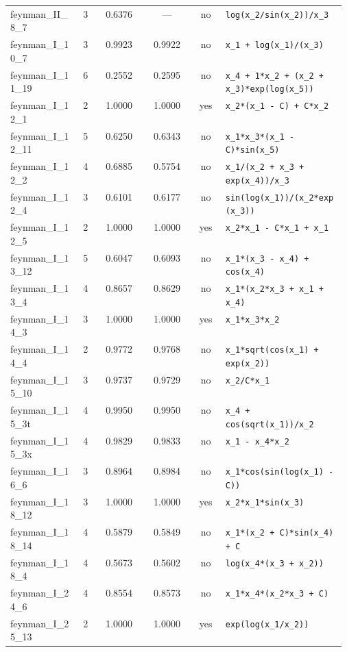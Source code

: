 \begin{footnotesize}
\begin{longtable}{p{0.215\linewidth} c c c c p{0.36\linewidth}}
feynman\_II\_8\_7 & 3 & 0.6376 & --- & no & \texttt{log(x\_2/sin(x\_2))/x\_3} \\
feynman\_I\_10\_7 & 3 & 0.9923 & 0.9922 & no & \texttt{x\_1 + log(x\_1)/(x\_3)} \\
feynman\_I\_11\_19 & 6 & 0.2552 & 0.2595 & no & \texttt{x\_4 + 1*x\_2 + (x\_2 + x\_3)*exp(log(x\_5))} \\
feynman\_I\_12\_1 & 2 & 1.0000 & 1.0000 & yes & \texttt{x\_2*(x\_1 - C) + C*x\_2} \\
feynman\_I\_12\_11 & 5 & 0.6250 & 0.6343 & no & \texttt{x\_1*x\_3*(x\_1 - C)*sin(x\_5)} \\
feynman\_I\_12\_2 & 4 & 0.6885 & 0.5754 & no & \texttt{x\_1/(x\_2 + x\_3 + exp(x\_4))/x\_3} \\
feynman\_I\_12\_4 & 3 & 0.6101 & 0.6177 & no & \texttt{sin(log(x\_1))/(x\_2*exp(x\_3))} \\
feynman\_I\_12\_5 & 2 & 1.0000 & 1.0000 & yes & \texttt{x\_2*x\_1 - C*x\_1 + x\_1} \\
feynman\_I\_13\_12 & 5 & 0.6047 & 0.6093 & no & \texttt{x\_1*(x\_3 - x\_4) + cos(x\_4)} \\
feynman\_I\_13\_4 & 4 & 0.8657 & 0.8629 & no & \texttt{x\_1*(x\_2*x\_3 + x\_1 + x\_4)} \\
feynman\_I\_14\_3 & 3 & 1.0000 & 1.0000 & yes & \texttt{x\_1*x\_3*x\_2} \\
feynman\_I\_14\_4 & 2 & 0.9772 & 0.9768 & no & \texttt{x\_1*sqrt(cos(x\_1) + exp(x\_2))} \\
feynman\_I\_15\_10 & 3 & 0.9737 & 0.9729 & no & \texttt{x\_2/C*x\_1} \\
feynman\_I\_15\_3t & 4 & 0.9950 & 0.9950 & no & \texttt{x\_4 + cos(sqrt(x\_1))/x\_2} \\
feynman\_I\_15\_3x & 4 & 0.9829 & 0.9833 & no & \texttt{x\_1 - x\_4*x\_2} \\
feynman\_I\_16\_6 & 3 & 0.8964 & 0.8984 & no & \texttt{x\_1*cos(sin(log(x\_1) - C))} \\
feynman\_I\_18\_12 & 3 & 1.0000 & 1.0000 & yes & \texttt{x\_2*x\_1*sin(x\_3)} \\
feynman\_I\_18\_14 & 4 & 0.5879 & 0.5849 & no & \texttt{x\_1*(x\_2 + C)*sin(x\_4) + C} \\
feynman\_I\_18\_4 & 4 & 0.5673 & 0.5602 & no & \texttt{log(x\_4*(x\_3 + x\_2))} \\
feynman\_I\_24\_6 & 4 & 0.8554 & 0.8573 & no & \texttt{x\_1*x\_4*(x\_2*x\_3 + C)} \\
feynman\_I\_25\_13 & 2 & 1.0000 & 1.0000 & yes & \texttt{exp(log(x\_1/x\_2))} \\

\end{longtable}
\end{footnotesize}
